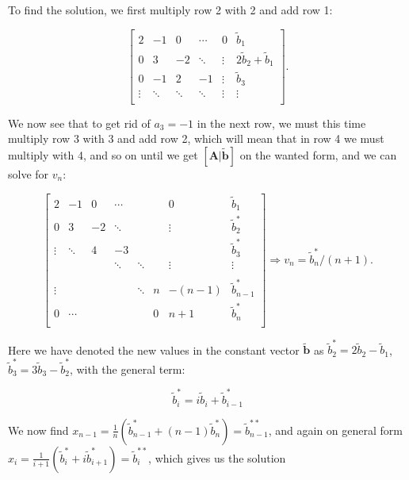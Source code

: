 \documentclass[]{article}
\begin{document}
To find the solution, we first multiply row 2 with 2 and add row 1:

\begin{equation*}
\left[ \begin{array} {ccccc|c}
2 & -1 & 0 & \cdots & 0 & \tilde{b}_1\\
0 & 3 & -2 & \ddots & \vdots & 2\tilde{b}_2 + \tilde{b}_1\\
0 & -1 & 2 & -1 & \vdots & \tilde{b}_3\\
\vdots & \ddots & \ddots & \ddots & \vdots & \vdots \\
\end{array} \right].
\end{equation*}

We now see that to get rid of $a_3 = -1$ in the next row, we must this time multiply row 3 with 3 and add row 2, which will mean that in row 4 we must multiply with 4, and so on until we get $[\mathbf{A}|\mathbf{\tilde{b}}]$ on the wanted form, and we can solve for $v_n$:

\begin{equation*}
\left[ \begin{array} {ccccccc|c}
2 & -1 & 0 & \cdots & & & 0 & \tilde{b}_1\\
0 & 3 & -2 & \ddots & & & \vdots & \tilde{b}_{2}^{\ast}\\
\vdots & \ddots & 4 & -3 & & & & \tilde{b}_{3}^{\ast}\\
& & & \ddots & \ddots &&  \vdots& \vdots\\
&&&&&&&\\
\vdots & & & & \ddots & n & -(n-1) & \tilde{b}_{n-1}^{\ast}\\
0 & \cdots & & & & 0 & n+1 & \tilde{b}_{n}^{\ast}\\
\end{array} \right]
\Rightarrow v_n = \tilde{b}_{n}^{\ast} / (n+1).
\end{equation*}

Here we have denoted the new values in the constant vector $\mathbf{\tilde{b}}$ as $\tilde{b}_{2}^{\ast} = 2\tilde{b}_2 - \tilde{b}_1$,
$\tilde{b}_{3}^{\ast} = 3\tilde{b}_3 - \tilde{b}_{2}^{\ast}$, with the general term:

\begin{equation*}
\tilde{b}_{i}^{\ast} = i\tilde{b}_{i} + \tilde{b}_{i-1}^{\ast}
\end{equation*}

We now find $x_{n-1} = \frac{1}{n}(\tilde{b}_{n-1}^{\ast} + (n-1)\tilde{b}_{n}^{\ast}) = \tilde{b}_{n-1}^{\ast\ast}$, and again on general form $x_i = \frac{1}{i+1}(\tilde{b}_{i}^{\ast} + i\tilde{b}_{i+1}^{\ast}) = \tilde{b}_{i}^{\ast\ast}$, which gives us the solution
\end{document}
